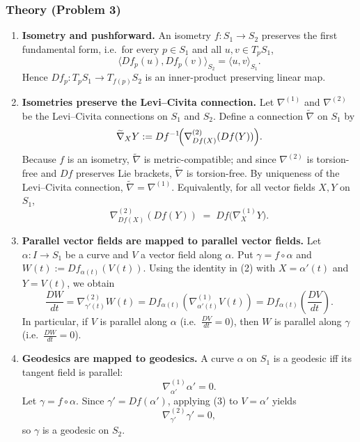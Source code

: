 \documentclass[12pt,a4paper]{article}
\theoremstyle{plain}
\theoremstyle{definition}      %
\begin{document}
	
	\subsubsection*{Theory (Problem 3)}
	
	\begin{enumerate}
		\item \textbf{Isometry and pushforward.}
		An isometry $f:S_1\to S_2$ preserves the first fundamental form, i.e.\ for every $p\in S_1$ and all
		$u,v\in T_pS_1$,
		\[
		\langle Df_p(u),Df_p(v)\rangle_{S_2}=\langle u,v\rangle_{S_1}.
		\]
		Hence $Df_p:T_pS_1\to T_{f(p)}S_2$ is an inner-product preserving linear map.
		
		\item \textbf{Isometries preserve the Levi--Civita connection.}
		Let $\nabla^{(1)}$ and $\nabla^{(2)}$ be the Levi--Civita connections on $S_1$ and $S_2$.
		Define a connection $\widetilde{\nabla}$ on $S_1$ by
		\[
		\widetilde{\nabla}_X Y := Df^{-1}\!\Bigl(\nabla^{(2)}_{Df(X)}(Df(Y))\Bigr).
		\]
		Because $f$ is an isometry, $\widetilde{\nabla}$ is metric-compatible; and since $\nabla^{(2)}$ is torsion-free and
		$Df$ preserves Lie brackets, $\widetilde{\nabla}$ is torsion-free. By uniqueness of the Levi--Civita connection,
		$\widetilde{\nabla}=\nabla^{(1)}$. Equivalently, for all vector fields $X,Y$ on $S_1$,
		\[
		\nabla^{(2)}_{Df(X)}(Df(Y)) \;=\; Df\bigl(\nabla^{(1)}_X Y\bigr).
		\]
		
		\item \textbf{Parallel vector fields are mapped to parallel vector fields.}
		Let $\alpha:I\to S_1$ be a curve and $V$ a vector field along $\alpha$.
		Put $\gamma=f\circ\alpha$ and $W(t):=Df_{\alpha(t)}(V(t))$.
		Using the identity in (2) with $X=\alpha'(t)$ and $Y=V(t)$, we obtain
		\[
		\frac{DW}{dt}
		=\nabla^{(2)}_{\gamma'(t)}W(t)
		= Df_{\alpha(t)}\!\left(\nabla^{(1)}_{\alpha'(t)}V(t)\right)
		= Df_{\alpha(t)}\!\left(\frac{DV}{dt}\right).
		\]
		In particular, if $V$ is parallel along $\alpha$ (i.e.\ $\frac{DV}{dt}=0$), then $W$ is parallel along $\gamma$
		(i.e.\ $\frac{DW}{dt}=0$).
		
		\item \textbf{Geodesics are mapped to geodesics.}
		A curve $\alpha$ on $S_1$ is a geodesic iff its tangent field is parallel:
		\[
		\nabla^{(1)}_{\alpha'}\alpha' = 0.
		\]
		Let $\gamma=f\circ\alpha$. Since $\gamma'=Df(\alpha')$, applying (3) to $V=\alpha'$ yields
		\[
		\nabla^{(2)}_{\gamma'}\gamma' = 0,
		\]
		so $\gamma$ is a geodesic on $S_2$.
	\end{enumerate}
	
\end{document}
